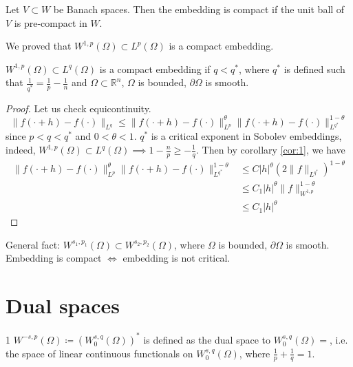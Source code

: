 \documentclass{report}
\begin{document}
\dfn{}
{
    Let \(V \subset W\) be Banach spaces. Then the embedding is compact if the unit ball of \(V\) is pre-compact in \(W\).
}

\begin{note}
    We proved that \(W^{1, p}(\Omega) \subset L^{p}(\Omega)\) is a compact embedding.
\end{note}

\cor{}
{
    \(W^{1, p}(\Omega) \subset L^{q}(\Omega)\) is a compact embedding if \(q < q^{*}\), where \(q^{*}\) is defined such that \(\frac{1}{q^{*}} = \frac{1}{p} - \frac{1}{n}\) and \(\Omega \subset  \mathbb{R}^{n}\), \(\Omega\) is bounded, \(\partial \Omega\) is smooth.
}

\begin{proof}
    Let us check equicontinuity. 
    \[
        \|f(\cdot + h) - f(\cdot)\|_{L^{q}} \leq \|f(\cdot + h) - f(\cdot)\|_{L^{p}}^{\theta} \|f(\cdot + h) - f(\cdot)\|_{L^{q^{*}}}^{1-\theta} 
    \]
    since \(p < q < q^{*}\) and \(0 < \theta < 1\). \(q^{*}\) is a critical exponent in Sobolev embeddings, indeed, \(W^{1, p}(\Omega) \subset L^{q}(\Omega) \implies 1-\frac{n}{p} \geq -\frac{1}{q}\). Then by corollary \ref{cor:1}, we have
    \begin{align*}
        \|f(\cdot + h) - f(\cdot)\|_{L^{p}}^{\theta} \|f(\cdot + h) - f(\cdot)\|_{L^{q^{*}}}^{1-\theta} &\leq C \vert h \vert ^{\theta}(2\|f\|_{L^{q^{*}}})^{1-\theta} \\
        &\leq C_1 \vert h \vert ^{\theta} \|f\|_{W^{1, p}}^{1-\theta} \\
        &\leq C_1 \vert h \vert ^{\theta}
    \end{align*}
\end{proof}

General fact: \(W^{s_1, p_1}(\Omega) \subset W^{s_2, p_2}(\Omega)\), where \(\Omega\) is bounded, \(\partial \Omega\) is smooth. Embedding is compact \(\iff\) embedding is not critical.

\section{Dual spaces}
\begin{definition}{}{1}
    \(W^{-s, p}(\Omega) \coloneqq \left(W^{s, q}_{0}(\Omega)\right)^{*}\) is defined as the dual space to \(W^{s, q}_{0}(\Omega) =\), i.e. the space of linear continuous functionals on \(W^{s, q}_{0}(\Omega)\), where \(\frac{1}{p} + \frac{1}{q} = 1\).
\end{definition}
\end{document}
